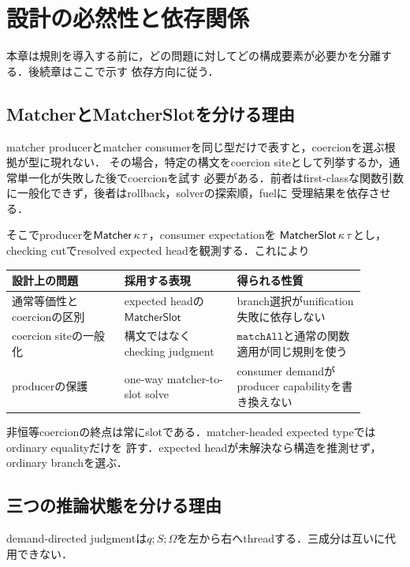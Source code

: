 \section{設計の必然性と依存関係}

本章は規則を導入する前に，どの問題に対してどの構成要素が必要かを分離する．後続章はここで示す
依存方向に従う．

\subsection{MatcherとMatcherSlotを分ける理由}

matcher producerとmatcher consumerを同じ型だけで表すと，coercionを選ぶ根拠が型に現れない．
その場合，特定の構文をcoercion siteとして列挙するか，通常単一化が失敗した後でcoercionを試す
必要がある．前者はfirst-classな関数引数に一般化できず，後者はrollback，solverの探索順，fuelに
受理結果を依存させる．

そこでproducerを$\mathsf{Matcher}\,\kappa\,\tau$，consumer expectationを
$\mathsf{MatcherSlot}\,\kappa\,\tau$とし，checking cutでresolved expected headを観測する．これにより

\begin{center}
\begin{tabular}{p{0.28\linewidth}p{0.29\linewidth}p{0.32\linewidth}}
\toprule
設計上の問題 & 採用する表現 & 得られる性質 \\
\midrule
通常等価性とcoercionの区別
  & expected headの$\mathsf{MatcherSlot}$
  & branch選択がunification失敗に依存しない \\
coercion siteの一般化
  & 構文ではなくchecking judgment
  & $\mathtt{matchAll}$と通常の関数適用が同じ規則を使う \\
producerの保護
  & one-way matcher-to-slot solve
  & consumer demandがproducer capabilityを書き換えない \\
\bottomrule
\end{tabular}
\end{center}

非恒等coercionの終点は常にslotである．matcher-headed expected typeではordinary equalityだけを
許す．expected headが未解決なら構造を推測せず，ordinary branchを選ぶ．

\subsection{三つの推論状態を分ける理由}

demand-directed judgmentは$q;S;\Omega$を左から右へthreadする．三成分は互いに代用できない．

